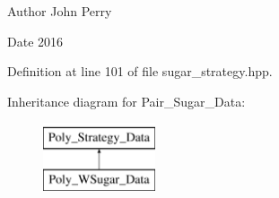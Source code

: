 \begin{DoxyAuthor}{Author}
John Perry 
\end{DoxyAuthor}
\begin{DoxyDate}{Date}
2016 
\end{DoxyDate}


Definition at line 101 of file sugar\+\_\+strategy.\+hpp.

Inheritance diagram for Pair\+\_\+\+Sugar\+\_\+\+Data\+:\begin{figure}[H]
\begin{center}
\leavevmode
\includegraphics[height=2.000000cm]{group__strategygroup}
\end{center}
\end{figure}
